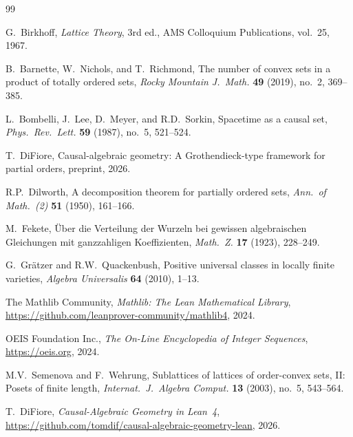 \documentclass[11pt,a4paper]{article}
\theoremstyle{plain}
\theoremstyle{definition}
\theoremstyle{remark}
\begin{document}
\begin{thebibliography}{99}

G.~Birkhoff,
\emph{Lattice Theory}, 3rd ed.,
AMS Colloquium Publications, vol.~25, 1967.

B.~Barnette, W.~Nichols, and T.~Richmond,
The number of convex sets in a product of totally ordered sets,
\emph{Rocky Mountain J.\ Math.} \textbf{49} (2019), no.~2, 369--385.

L.~Bombelli, J.~Lee, D.~Meyer, and R.D.~Sorkin,
Spacetime as a causal set,
\emph{Phys.\ Rev.\ Lett.} \textbf{59} (1987), no.~5, 521--524.

T.~DiFiore,
Causal-algebraic geometry: A Grothendieck-type framework for partial orders,
preprint, 2026.

R.P.~Dilworth,
A decomposition theorem for partially ordered sets,
\emph{Ann.\ of Math.\ (2)} \textbf{51} (1950), 161--166.

M.~Fekete,
\"Uber die Verteilung der Wurzeln bei gewissen algebraischen Gleichungen mit ganzzahligen Koeffizienten,
\emph{Math.\ Z.} \textbf{17} (1923), 228--249.

G.~Gr\"atzer and R.W.~Quackenbush,
Positive universal classes in locally finite varieties,
\emph{Algebra Universalis} \textbf{64} (2010), 1--13.

The Mathlib Community,
\emph{Mathlib: The Lean Mathematical Library},
\url{https://github.com/leanprover-community/mathlib4}, 2024.

OEIS Foundation Inc.,
\emph{The On-Line Encyclopedia of Integer Sequences},
\url{https://oeis.org}, 2024.

M.V.~Semenova and F.~Wehrung,
Sublattices of lattices of order-convex sets, II: Posets of finite length,
\emph{Internat.\ J.\ Algebra Comput.} \textbf{13} (2003), no.~5, 543--564.

T.~DiFiore,
\emph{Causal-Algebraic Geometry in Lean~4},
\url{https://github.com/tomdif/causal-algebraic-geometry-lean}, 2026.

\end{thebibliography}
\end{document}
